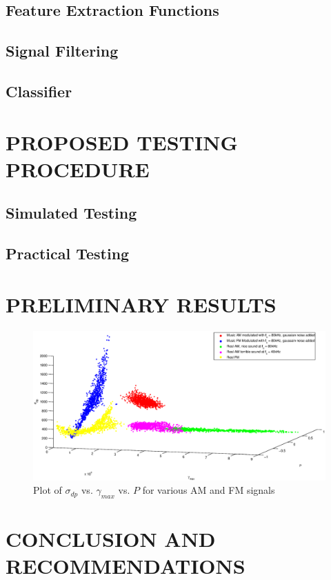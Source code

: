 \documentclass[10pt,twocolumn]{witseiepaper}
\begin{document}

		\subsection{Feature Extraction Functions}


		\subsection{Signal Filtering}

		\subsection{Classifier}


\section{PROPOSED TESTING PROCEDURE}
	\subsection{Simulated Testing}
	\subsection{Practical Testing}

\section{PRELIMINARY RESULTS}
	\begin{figure}[!h]
		\centering
		\includegraphics[width=1.1\textwidth]{plot0.eps}
		\caption{Plot of $\sigma_{dp}$ vs. $\gamma_{max}$ vs. $P$ for various AM and FM signals}
		\label{fig:plot0}
	\end{figure}

\section{CONCLUSION AND RECOMMENDATIONS}




\end{document}
